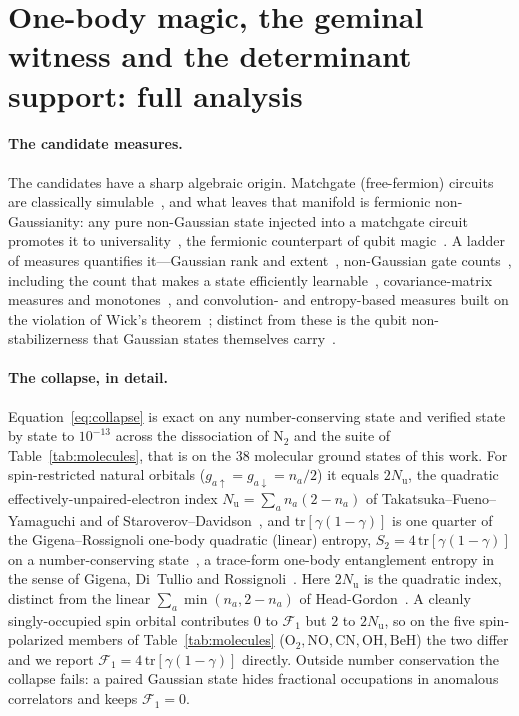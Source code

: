 \section{One-body magic, the geminal witness and the determinant support: full analysis}
\label{sm:nogo}

\paragraph{The candidate measures.} The candidates have a sharp algebraic origin. Matchgate (free-fermion) circuits are classically
simulable~\cite{valiant2002,terhaldivincenzo2002,bravyi2005flo,jozsamiyake2008}, and what leaves that
manifold is fermionic non-Gaussianity: any pure non-Gaussian state injected into a matchgate circuit
promotes it to universality~\cite{hebenstreit2019}, the fermionic counterpart of qubit
magic~\cite{bravyikitaev2005,leone2022sre}. A ladder of measures quantifies it---Gaussian rank and
extent~\cite{cudbystrelchuk2023}, non-Gaussian gate counts~\cite{reardonsmith2024,diaskoenig2024},
including the count that makes a state efficiently learnable~\cite{melehera2025}, covariance-matrix
measures and monotones~\cite{sierant2026,tarabunga2026}, and convolution- and entropy-based measures built on the
violation of Wick's theorem~\cite{coffman2025}; distinct from these is the qubit non-stabilizerness
that Gaussian states themselves carry~\cite{collura2026}.

\paragraph{The collapse, in detail.} Equation~\eqref{eq:collapse} is exact on any number-conserving state and verified state by state to $10^{-13}$ across the dissociation of
$\mathrm{N_2}$ and the suite of Table~\ref{tab:molecules}, that is on the $38$ molecular ground states
of this work. For spin-restricted natural orbitals
($g_{a\uparrow}=g_{a\downarrow}=n_a/2$) it equals $2N_{\mathrm u}$, the quadratic
effectively-unpaired-electron index $N_{\mathrm u}=\sum_a n_a(2-n_a)$ of Takatsuka--Fueno--Yamaguchi and
of Staroverov--Davidson~\cite{takatsuka1978,staroverov2000}, and $\mathrm{tr}[\gamma(1-\gamma)]$ is one
quarter of the Gigena--Rossignoli one-body quadratic (linear) entropy, $S_2=4\,\mathrm{tr}[\gamma(1-\gamma)]$
on a number-conserving state~\cite{gigena2015}, a trace-form one-body entanglement entropy in the
sense of Gigena, Di~Tullio and Rossignoli~\cite{gigena2020}. Here $2N_{\mathrm u}$ is
the quadratic index, distinct from the linear $\sum_a\min(n_a,2-n_a)$ of
Head-Gordon~\cite{headgordon2003}. A cleanly singly-occupied spin orbital contributes $0$ to
$\mathcal F_1$ but $2$ to $2N_{\mathrm u}$, so on the five spin-polarized members of
Table~\ref{tab:molecules} ($\mathrm{O_2},\mathrm{NO},\mathrm{CN},\mathrm{OH},\mathrm{BeH}$) the two differ
and we report $\mathcal F_1=4\,\mathrm{tr}[\gamma(1-\gamma)]$ directly. Outside number conservation the
collapse fails: a paired Gaussian state hides fractional occupations in anomalous correlators and keeps
$\mathcal F_1=0$.


